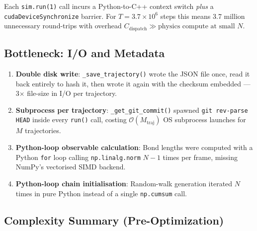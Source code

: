 \documentclass[12pt,a4paper]{article}
\newcommand{\Obig}[1]{\mathcal{O}\!\left(#1\right)}
\newcommand{\code}[1]{\texttt{#1}}
\begin{document}
Each \code{sim.run(1)} call incurs a Python-to-C++ context switch \emph{plus} a
\code{cudaDeviceSynchronize} barrier. For $T = 3.7\times10^6$ steps this means
3.7 million unnecessary round-trips with overhead $C_\text{dispatch} \gg
\text{physics compute at small } N$.

\subsection{Bottleneck: I/O and Metadata}
\label{sec:old-io}

\begin{enumerate}[label=\alph*)]
  \item \textbf{Double disk write}: \code{\_save\_trajectory()} wrote the JSON file once,
        read it back entirely to hash it, then wrote it again with the checksum
        embedded — 3$\times$ file-size in I/O per trajectory.
  \item \textbf{Subprocess per trajectory}: \code{\_get\_git\_commit()} spawned
        \code{git rev-parse HEAD} inside every \code{run()} call, costing
        $\Obig{M_\text{traj}}$ OS subprocess launches for $M$ trajectories.
  \item \textbf{Python-loop observable calculation}: Bond lengths were computed
        with a Python \code{for} loop calling \code{np.linalg.norm} $N-1$ times
        per frame, missing NumPy's vectorised SIMD backend.
  \item \textbf{Python-loop chain initialisation}: Random-walk generation iterated
        $N$ times in pure Python instead of a single \code{np.cumsum} call.
\end{enumerate}

\subsection{Complexity Summary (Pre-Optimization)}
\label{sec:old-summary}
\end{document}
